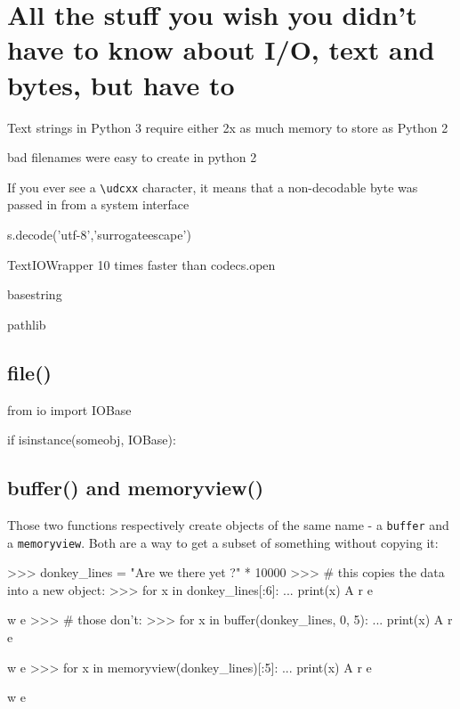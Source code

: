 \chapter{All the stuff you wish you didn't have to know about I/O, text and bytes, but have to}\label{chap:text_and_bytes}


Text strings in Python 3 require either 2x as much memory to store as Python 2


bad filenames were easy to create in python 2

If you ever see a \lstinline{\udcxx} character, it means that a non-decodable byte was passed in from a system interface

s.decode('utf-8','surrogateescape')

TextIOWrapper 10 times faster than codecs.open

basestring



pathlib


\section{file()}

\begin{py2}
from io import IOBase

if isinstance(someobj, IOBase):
\end{py2}

\section{buffer() and memoryview()}

Those two functions respectively create objects of the same name - a \lstinline{buffer} and a \lstinline{memoryview}. Both are a way to get a subset of something without copying it:

\begin{py2}
>>> donkey_lines = "Are we there yet ?\n" * 10000
>>> # this copies the data into a new object:
>>> for x in donkey_lines[:6]:
...    print(x)
A
r
e

w
e
>>> # those don't:
>>> for x in buffer(donkey_lines, 0, 5):
...    print(x)
A
r
e

w
e
>>> for x in memoryview(donkey_lines)[:5]:
...    print(x)
A
r
e

w
e
\end{py2}

